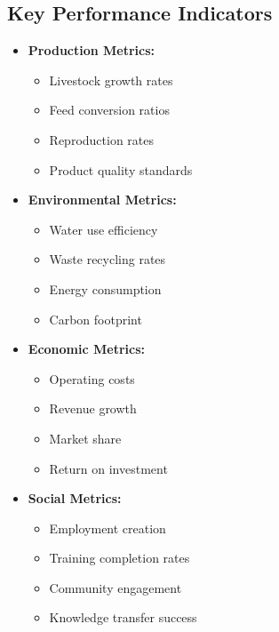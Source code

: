 \subsection{Key Performance Indicators}
\begin{itemize}
    \item \textbf{Production Metrics:}
    \begin{itemize}
        \item Livestock growth rates
        \item Feed conversion ratios
        \item Reproduction rates
        \item Product quality standards
    \end{itemize}
    
    \item \textbf{Environmental Metrics:}
    \begin{itemize}
        \item Water use efficiency
        \item Waste recycling rates
        \item Energy consumption
        \item Carbon footprint
    \end{itemize}
    
    \item \textbf{Economic Metrics:}
    \begin{itemize}
        \item Operating costs
        \item Revenue growth
        \item Market share
        \item Return on investment
    \end{itemize}
    
    \item \textbf{Social Metrics:}
    \begin{itemize}
        \item Employment creation
        \item Training completion rates
        \item Community engagement
        \item Knowledge transfer success
    \end{itemize}
\end{itemize}

